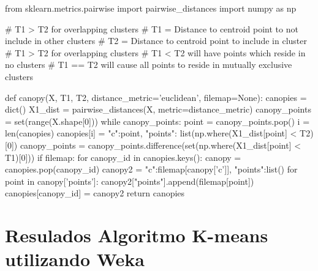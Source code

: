 \documentclass[a4paper, 12pt]{article}
\begin{document}
\begin{python}
from sklearn.metrics.pairwise import pairwise_distances
import numpy as np

# T1 > T2 for overlapping clusters
# T1 = Distance to centroid point to not include in other clusters
# T2 = Distance to centroid point to include in cluster
# T1 > T2 for overlapping clusters
# T1 < T2 will have points which reside in no clusters
# T1 == T2 will cause all points to reside in mutually exclusive clusters

def canopy(X, T1, T2, distance_metric='euclidean', filemap=None):
    canopies = dict()
    X1_dist = pairwise_distances(X, metric=distance_metric)
    canopy_points = set(range(X.shape[0]))
    while canopy_points:
        point = canopy_points.pop()
        i = len(canopies)
        canopies[i] = {"c":point, "points": list(np.where(X1_dist[point] < T2)[0])}
        canopy_points = canopy_points.difference(set(np.where(X1_dist[point] < T1)[0]))
    if filemap:
        for canopy_id in canopies.keys():
            canopy = canopies.pop(canopy_id)
            canopy2 = {"c":filemap[canopy['c']], "points":list()}
            for point in canopy['points']:
                canopy2["points"].append(filemap[point])
            canopies[canopy_id] = canopy2
    return canopies

\end{python}

\newpage
\section{Resulados Algoritmo K-means utilizando Weka} \label{App:AppendixE}
\end{document}
